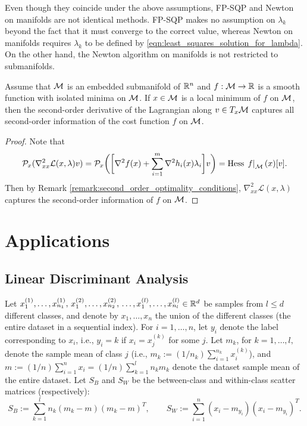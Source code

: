 \documentclass[11pt,a4paper]{article}
\begin{document}
\begin{remark}
Even though they coincide under the above assumptions, FP-SQP and Newton
on manifolds are not identical methods. FP-SQP makes no assumption on $\lambda_k$ beyond the fact that it must converge to the correct value, whereas Newton on manifolds requires $\lambda_k$ to be defined by \eqref{eqn:least_squares_solution_for_lambda}. On the other hand, the Newton algorithm on manifolds is not restricted to submanifolds.
\end{remark}

\begin{proposition}
Assume that $\mathcal{M}$ is an embedded submanifold of $\mathbb{R}^n$ and $f:\mathcal{M}\rightarrow \mathbb{R}$ is a smooth function with isolated minima on $\mathcal{M}$. If $x\in \mathcal{M}$ is a local minimum of $f$ on $\mathcal{M}$, then the second-order derivative of the Lagrangian along $v \in T_{x}\mathcal{M}$ captures all second-order information of the cost function $f$ on $\mathcal{M}$.
\end{proposition}

\begin{proof}
Note that 
\begin{equation*}
\mathcal{P}_x(\nabla^2_{xx}\mathcal{L}(x,\lambda)v) =  \mathcal{P}_x\bigg(\bigg[\nabla^2 f(x)+\sum_{i=1}^m\nabla^2 h_i(x)\lambda_i\bigg]v\bigg) = \text{Hess}\,\left.f\right|_{\mathcal{M}}(x)[v].
\end{equation*}
Then by Remark \ref{remark:second_order_optimality_conditions}, $\nabla^2_{xx}\mathcal{L}(x,\lambda)$ captures the second-order information of $f$ on $\mathcal{M}$.
\end{proof}

\section{Applications}

\subsection{Linear Discriminant Analysis}

Let $x^{(1)}_1,\ldots,x^{(1)}_{n_1},\,x^{(2)}_1,\ldots,x^{(2)}_{n_2},\,\ldots,x^{(l)}_1,\ldots,x^{(l)}_{n_l}\in \mathbb{R}^d$ be samples from $l\le d$ different classes, and denote by $x_1,\ldots,x_n$ the union of the different classes (the entire dataset in a sequential index). For $i = 1,\ldots,n$, let $y_i$ denote the label corresponding to $x_i$, i.e., $y_i = k$ if $x_i = x^{(k)}_j$ for some $j$. Let $m_k$, for $k = 1,\ldots,l,$ denote the sample mean of class $j$ (i.e., $m_k := (1/n_k)\sum_{i=1}^{n_k}x_i^{(k)}$), and $m:=(1/n)\sum_{i=1}^nx_i = (1/n)\sum_{k = 1}^ln_km_k$ denote the dataset sample mean of the entire dataset. Let $S_B$ and $S_W$ be the between-class and within-class scatter matrices (respectively):
\begin{equation*}
S_B:= \sum_{k=1}^l n_k(m_k-m)(m_k-m)^T,\qquad S_W:= \sum_{i=1}^n (x_i-m_{y_i})(x_i-m_{y_i})^T.
\end{equation*}
\end{document}
